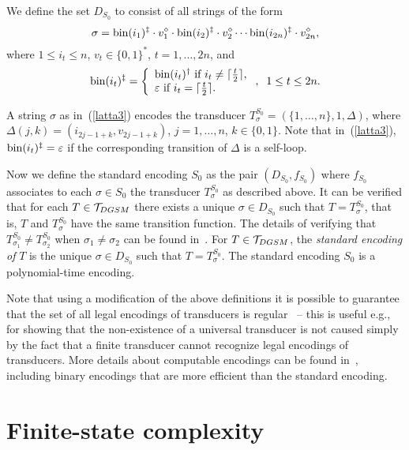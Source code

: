 \documentclass[copyright]{eptcs}
\begin{document}
We define the set $D_{S_0}$  to consist of
all strings of the form
\begin{equation}
\label{latta3}
\sigma=
{\rm bin}(i_1)^{\ddagger} \cdot
v_1^{\diamond} \cdot
{\rm bin}(i_2)^{\ddagger} \cdot v_2^{\diamond}
\cdots {\rm bin}(i_{2n})^{\ddagger} \cdot v_{2n}^{\diamond},
\end{equation}
where $1 \leq i_t \leq n$, $v_t \in \{ 0, 1 \}^*$,
$t = 1, \ldots, 2n$,
and
$$
{\rm bin}(i_t)^{\ddagger} = \left \{
\begin{array}{l}
{\rm bin}(i_t)^{\dagger} \mbox{ if }  i_t \neq 
\lceil \frac{t}{2} \rceil, \\
\varepsilon \mbox{ if }  i_t  =
\lceil \frac{t}{2} \rceil. 
\end{array} \right., \;\;
1 \leq t \leq 2n.
$$

A string $\sigma$ as in~(\ref{latta3}) encodes
the transducer $T^{S_0}_\sigma = (\{1, \ldots, n \},  1, \Delta)$,
where
$\Delta(j, k) =
({i_{2j-1+k}}, v_{2j-1+k})$,
$j =  1, \ldots, n$, $k\in \{0,1\}$.
Note that in~(\ref{latta3}),
${\rm bin}(i_t)^{\ddagger}=\varepsilon$
if the corresponding transition of $\Delta$ is a self-loop.


Now we define the
standard encoding $S_0$ as the pair $(D_{S_0},
f_{S_0})$ where $f_{S_0}$ associates
to each $\sigma \in S_0$ the transducer 
$T^{S_0}_\sigma$ as described above.
It can be verified  that for each
$T \in {\cal T}_{DGSM}$ there exists a unique
$\sigma \in D_{S_0}$ such that $T = T^{S_0}_\sigma$,
that is, $T$ and $T^{S_0}_\sigma$ have the same
transition function.
The details of verifying that $T^{S_0}_{\sigma_1} \neq
T^{S_0}_{\sigma_2}$ when $\sigma_1 \neq \sigma_2$ can
be found in~\cite{CSR}. For  $T \in {\cal T}_{DGSM}$, 
the {\em standard encoding of\/} $T$ is the unique
$\sigma \in D_{S_0}$ such that $T = T^{S_0}_\sigma$.
The standard encoding  $S_0$ is a
polynomial-time encoding. 




Note that using a modification of the above definitions
it is possible
to guarantee that the set of all legal encodings of transducers
is regular~\cite{CSR} -- this is useful e.g.,
for  showing that the
non-existence of a universal transducer is not caused simply
by the fact that a finite transducer cannot recognize legal
encodings of transducers. More details about
computable encodings can be found in~\cite{CSR}, including
 binary encodings that are more efficient
than the standard encoding.



\section{Finite-state complexity}
\label{fs-compl}
\end{document}
